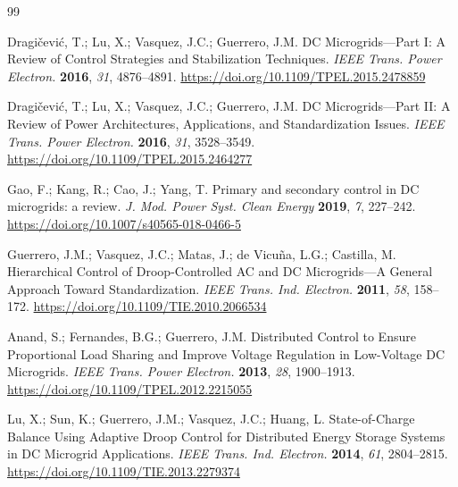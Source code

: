 \begin{thebibliography}{99}

Dragi\v{c}evi\'{c}, T.; Lu, X.; Vasquez, J.C.; Guerrero, J.M.
DC Microgrids---Part I: A Review of Control Strategies and Stabilization Techniques.
\emph{IEEE Trans. Power Electron.} \textbf{2016}, \emph{31}, 4876--4891.
\url{https://doi.org/10.1109/TPEL.2015.2478859}

Dragi\v{c}evi\'{c}, T.; Lu, X.; Vasquez, J.C.; Guerrero, J.M.
DC Microgrids---Part II: A Review of Power Architectures, Applications, and Standardization Issues.
\emph{IEEE Trans. Power Electron.} \textbf{2016}, \emph{31}, 3528--3549.
\url{https://doi.org/10.1109/TPEL.2015.2464277}

Gao, F.; Kang, R.; Cao, J.; Yang, T.
Primary and secondary control in DC microgrids: a review.
\emph{J. Mod. Power Syst. Clean Energy} \textbf{2019}, \emph{7}, 227--242.
\url{https://doi.org/10.1007/s40565-018-0466-5}

Guerrero, J.M.; Vasquez, J.C.; Matas, J.; de Vicu\~{n}a, L.G.; Castilla, M.
Hierarchical Control of Droop-Controlled AC and DC Microgrids---A General Approach Toward Standardization.
\emph{IEEE Trans. Ind. Electron.} \textbf{2011}, \emph{58}, 158--172.
\url{https://doi.org/10.1109/TIE.2010.2066534}

Anand, S.; Fernandes, B.G.; Guerrero, J.M.
Distributed Control to Ensure Proportional Load Sharing and Improve Voltage Regulation in Low-Voltage DC Microgrids.
\emph{IEEE Trans. Power Electron.} \textbf{2013}, \emph{28}, 1900--1913.
\url{https://doi.org/10.1109/TPEL.2012.2215055}

Lu, X.; Sun, K.; Guerrero, J.M.; Vasquez, J.C.; Huang, L.
State-of-Charge Balance Using Adaptive Droop Control for Distributed Energy Storage Systems in DC Microgrid Applications.
\emph{IEEE Trans. Ind. Electron.} \textbf{2014}, \emph{61}, 2804--2815.
\url{https://doi.org/10.1109/TIE.2013.2279374}


\end{thebibliography}
